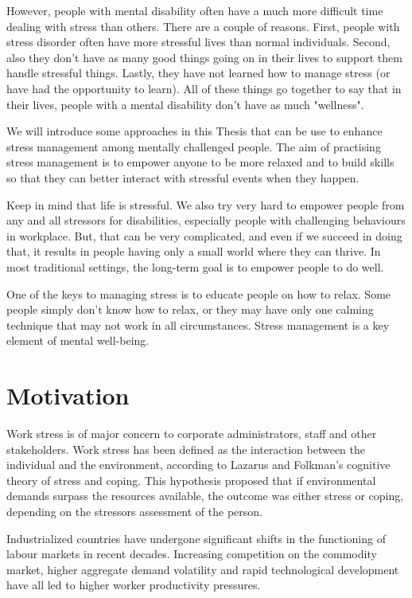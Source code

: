 However, people with mental disability often have a much more difficult time dealing with stress than others. There are a couple of reasons. First, people with stress disorder often have more stressful lives than normal individuals. Second, also they don't have as many good things going on in their lives to support them handle stressful things. Lastly, they have not learned how to manage stress (or have had the opportunity to learn). All of these things go together to say that in their lives, people with a mental disability don't have as much "wellness".

We will introduce some approaches in this Thesis that can be use to enhance stress management among mentally challenged people. The aim of practising stress management is to empower anyone to be more relaxed and to build skills so that they can better interact with stressful events when they happen. 

Keep in mind that life is stressful. We also try very hard to empower people from any and all stressors for disabilities, especially people with challenging behaviours in workplace. But, that can be very complicated, and even if we succeed in doing that, it results in people having only a small world where they can thrive. In most traditional settings, the long-term goal is to empower people to do well.

One of the keys to managing stress is to educate people on how to relax. Some people simply don't know how to relax, or they may have only one calming technique that may not work in all circumstances. Stress management is a key element of mental well-being.

\section{Motivation}
Work stress is of major concern to corporate administrators, staff and other stakeholders. Work stress has been defined as the interaction between the individual and the environment, according to Lazarus and Folkman's cognitive theory of stress and coping\citep{LazarusR.S.Folkman1984StressCoping.}. This hypothesis proposed that if environmental demands surpass the resources available, the outcome was either stress or coping, depending on the stressors assessment of the person.

Industrialized countries have undergone significant shifts in the functioning of labour markets in recent decades. Increasing competition on the commodity market, higher aggregate demand volatility and rapid technological development have all led to higher worker productivity pressures. 


